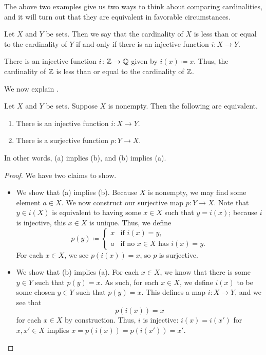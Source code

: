 \documentclass[../notes.tex]{subfiles}
\begin{document}
The above two examples give us two ways to think about comparing cardinalities, and it will turn out that they are equivalent in favorable circumstances.
\begin{definition}
    Let $X$ and $Y$ be sets. Then we say that the cardinality of $X$ is less than or equal to the cardinality of $Y$ if and only if there is an injective function $i\colon X\to Y$.
\end{definition}
\begin{example}
    There is an injective function $i\colon\mathbb Z\to\mathbb Q$ given by $i(x)\coloneqq x$. Thus, the cardinality of $\mathbb Z$ is less than or equal to the cardinality of $\mathbb Z$.
\end{example}
We now explain .
\begin{prop} \label{prop:compare-cards}
    Let $X$ and $Y$ be sets. Suppose $X$ is nonempty. Then the following are equivalent.
    \begin{enumerate}[label=(\alph*)]
        \item There is an injective function $i\colon X\to Y$.
        \item There is a surjective function $p\colon Y\to X$.
    \end{enumerate}
    In other words, (a) implies (b), and (b) implies (a).
\end{prop}
\begin{proof}
    We have two claims to show.
    \begin{itemize}
        \item We show that (a) implies (b). Because $X$ is nonempty, we may find some element $a\in X$. We now construct our surjective map $p\colon Y\to X$. Note that $y\in i(X)$ is equivalent to having some $x\in X$ such that $y=i(x)$; because $i$ is injective, this $x\in X$ is unique. Thus, we define
        \[p(y)\coloneqq\begin{cases}
            x & \text{if }i(x)=y, \\
            a & \text{if no }x\in X\text{ has }i(x)=y.
        \end{cases}\]
        For each $x\in X$, we see $p(i(x))=x$, so $p$ is surjective.
        \item We show that (b) implies (a). For each $x\in X$, we know that there is some $y\in Y$ such that $p(y)=x$. As such, for each $x\in X$, we define $i(x)$ to be some chosen $y\in Y$ such that $p(y)=x$. This defines a map $i\colon X\to Y$, and we see that
        \[p(i(x))=x\]
        for each $x\in X$ by construction. Thus, $i$ is injective: $i(x)=i(x')$ for $x,x'\in X$ implies $x=p(i(x))=p(i(x'))=x'$.
        \qedhere
    \end{itemize}
\end{proof}
\end{document}
